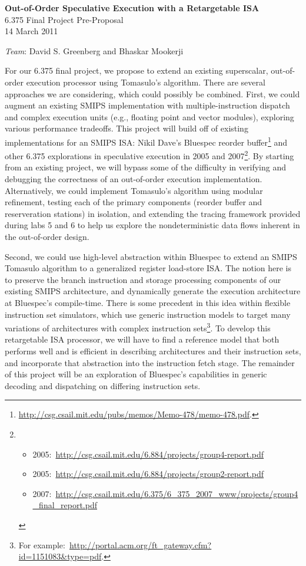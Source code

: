 \documentclass[12pt]{article}
\begin{document}
	\begin{center}
		\textbf{\large Out-of-Order Speculative Execution with a Retargetable ISA } \\
		6.375 Final Project Pre-Proposal\\
		14 March 2011 \\
		
		\vspace{\baselineskip}
		
		\emph{Team}: David S. Greenberg and Bhaskar Mookerji
	\end{center}
	
	For our 6.375 final project, we propose to extend an existing superscalar, out-of-order execution processor using Tomasulo's algorithm. There are several approaches we are considering, which could possibly be combined. First, we could augment an existing SMIPS implementation with multiple-instruction dispatch and complex execution units (e.g., floating point and vector modules), exploring various performance tradeoffs. This project will build off of existing implementations for an SMIPS ISA: Nikil Dave's  Bluespec reorder buffer\footnote{\url{http://csg.csail.mit.edu/pubs/memos/Memo-478/memo-478.pdf}.} and other 6.375 explorations in speculative execution in 2005 and 2007\footnote{\begin{itemize}
		\item 2005:~\url{http://csg.csail.mit.edu/6.884/projects/group4-report.pdf}
		\item 2005:~\url{http://csg.csail.mit.edu/6.884/projects/group2-report.pdf}
		\item 2007:~\url{http://csg.csail.mit.edu/6.375/6_375_2007_www/projects/group4_final_report.pdf}
	\end{itemize}}. By starting from an existing project, we will bypass some of the difficulty in verifying and debugging the correctness of an out-of-order execution implementation. Alternatively, we could implement Tomasulo's algorithm using modular refinement, testing each of the primary components (reorder buffer and reserveration stations) in isolation, and extending the tracing framework provided during labs 5 and 6 to help us explore the nondeterministic data flows inherent in the out-of-order design.
	
	Second, we could use high-level abstraction within Bluespec to extend an SMIPS Tomasulo algorithm to a generalized register load-store ISA. The notion here is to preserve the branch instruction and storage processing components of our existing SMIPS architecture, and dynamically generate the execution architecture at Bluespec's compile-time. There is some precedent in this idea within flexible instruction set simulators, which use generic instruction models to target many variations of architectures with complex instruction sets\footnote{For example:~\url{http://portal.acm.org/ft_gateway.cfm?id=1151083&type=pdf}.}. To develop this retargetable ISA processor, we will have to find a reference model that both performs well and is efficient in describing architectures and their instruction sets, and incorporate that abstraction into the instruction fetch stage. The remainder of this project will be an exploration of Bluespec's capabilities in generic decoding and dispatching on differing instruction sets.
	
\end{document}
